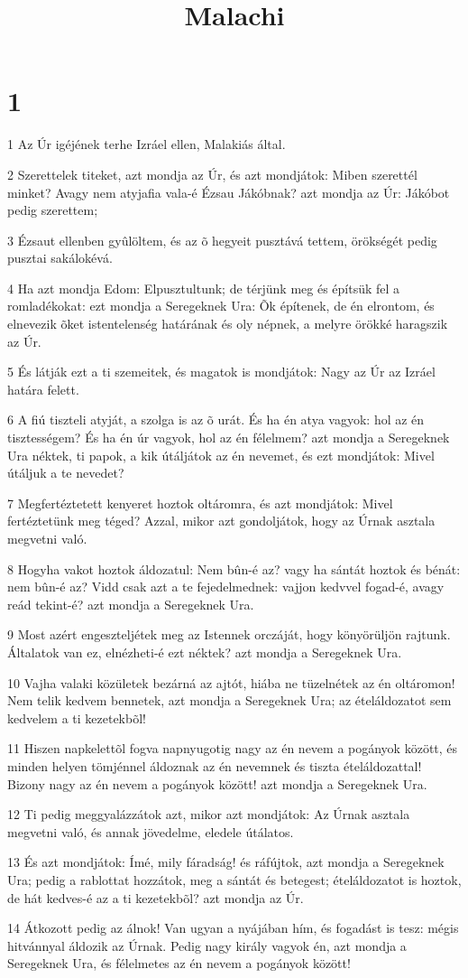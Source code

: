 

\title{Malachi}


\chapter{1}

\par 1 Az Úr igéjének terhe Izráel ellen, Malakiás által.
\par 2 Szerettelek titeket, azt mondja az Úr, és azt mondjátok: Miben szerettél minket? Avagy nem atyjafia vala-é Ézsau Jákóbnak? azt mondja az Úr: Jákóbot pedig szerettem;
\par 3 Ézsaut ellenben gyûlöltem, és az õ hegyeit pusztává tettem, örökségét pedig pusztai sakálokévá.
\par 4 Ha azt mondja Edom: Elpusztultunk; de térjünk meg és építsük fel a romladékokat: ezt mondja a Seregeknek Ura: Õk építenek, de én elrontom, és elnevezik õket istentelenség határának és oly népnek, a melyre örökké haragszik az Úr.
\par 5 És látják ezt a ti szemeitek, és magatok is mondjátok: Nagy az Úr az Izráel határa felett.
\par 6 A fiú tiszteli atyját, a szolga is az õ urát. És ha én atya vagyok: hol az én tisztességem? És ha én úr vagyok, hol az én félelmem? azt mondja a Seregeknek Ura néktek, ti papok, a kik útáljátok az én nevemet, és ezt mondjátok: Mivel útáljuk a te nevedet?
\par 7 Megfertéztetett kenyeret hoztok oltáromra, és azt mondjátok: Mivel fertéztetünk meg téged? Azzal, mikor azt gondoljátok, hogy az Úrnak asztala megvetni való.
\par 8 Hogyha vakot hoztok áldozatul: Nem bûn-é az? vagy ha sántát hoztok és bénát: nem bûn-é az? Vidd csak azt a te fejedelmednek: vajjon kedvvel fogad-é, avagy reád tekint-é? azt mondja a Seregeknek Ura.
\par 9 Most azért engeszteljétek meg az Istennek orczáját, hogy könyörüljön rajtunk. Általatok van ez, elnézheti-é ezt néktek? azt mondja a Seregeknek Ura.
\par 10 Vajha valaki közületek bezárná az ajtót, hiába ne tüzelnétek az én oltáromon! Nem telik kedvem bennetek, azt mondja a Seregeknek Ura; az ételáldozatot sem kedvelem a ti kezetekbõl!
\par 11 Hiszen napkelettõl fogva napnyugotig nagy az én nevem a pogányok között, és minden helyen tömjénnel áldoznak az én nevemnek és tiszta ételáldozattal! Bizony nagy az én nevem a pogányok között! azt mondja a Seregeknek Ura.
\par 12 Ti pedig meggyalázzátok azt, mikor azt mondjátok: Az Úrnak asztala megvetni való, és annak jövedelme, eledele útálatos.
\par 13 És azt mondjátok: Ímé, mily fáradság! és ráfújtok, azt mondja a Seregeknek Ura; pedig a rablottat hozzátok, meg a sántát és betegest; ételáldozatot is hoztok, de hát kedves-é az a ti kezetekbõl? azt mondja az Úr.
\par 14 Átkozott pedig az álnok! Van ugyan a nyájában hím, és fogadást is tesz: mégis hitvánnyal áldozik az Úrnak. Pedig nagy király vagyok én, azt mondja a Seregeknek Ura, és félelmetes az én nevem a pogányok között!

